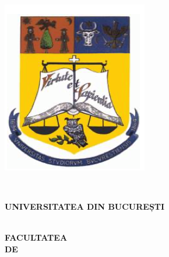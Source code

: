 \fancyhf{}
\renewcommand{\headrulewidth}{2pt}
\renewcommand{\footrulewidth}{1pt}
\fancyhead[LE]{\leftmark}
\fancyhead[RO]{\rightmark}
\linespread{1.25}

\begin{titlepage}
    \begin{center}
        \begin{figure}[htbp]
            \centering
            \begin{minipage}{0.2\textwidth}
              \includegraphics[width=\linewidth]{images/poza_stanga.png}
            \end{minipage}\
            \begin{minipage}{0.5\textwidth}
                \begin{large}
                    \textbf{UNIVERSITATEA DIN BUCUREȘTI}\\
                    \\
                    \begin{center}
                    \textbf{FACULTATEA\\
                                DE\\
}
\end{center}
\end{large}
\end{minipage}
\end{figure}
\end{center}
\end{titlepage}
